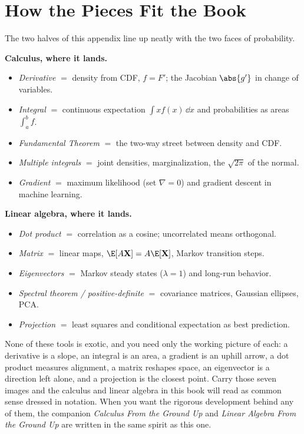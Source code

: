 \section{How the Pieces Fit the Book}
\label{chAcla:summary}

The two halves of this appendix line up neatly with the two faces of probability.

\begin{focusbox}
\textbf{Calculus, where it lands.}
\begin{itemize}
\item \emph{Derivative} $=$ density from CDF, $f=F'$; the Jacobian $\abs{g'}$ in change of variables.
\item \emph{Integral} $=$ continuous expectation $\int x f(x)\,\dd x$ and probabilities as areas
  $\int_a^b f$.
\item \emph{Fundamental Theorem} $=$ the two-way street between density and CDF.
\item \emph{Multiple integrals} $=$ joint densities, marginalization, the $\sqrt{2\pi}$ of the normal.
\item \emph{Gradient} $=$ maximum likelihood (set $\nabla=0$) and gradient descent in machine learning.
\end{itemize}

\textbf{Linear algebra, where it lands.}
\begin{itemize}
\item \emph{Dot product} $=$ correlation as a cosine; uncorrelated means orthogonal.
\item \emph{Matrix} $=$ linear maps, $\E[A\mathbf{X}]=A\E[\mathbf{X}]$, Markov transition steps.
\item \emph{Eigenvectors} $=$ Markov steady states ($\lambda=1$) and long-run behavior.
\item \emph{Spectral theorem / positive-definite} $=$ covariance matrices, Gaussian ellipses, PCA.
\item \emph{Projection} $=$ least squares and conditional expectation as best prediction.
\end{itemize}
\end{focusbox}

None of these tools is exotic, and you need only the working picture of each: a derivative is a slope,
an integral is an area, a gradient is an uphill arrow, a dot product measures alignment, a matrix
reshapes space, an eigenvector is a direction left alone, and a projection is the closest point. Carry
those seven images and the calculus and linear algebra in this book will read as common sense dressed
in notation. When you want the rigorous development behind any of them, the companion \emph{Calculus
From the Ground Up} and \emph{Linear Algebra From the Ground Up} are written in the same spirit as this
one.

